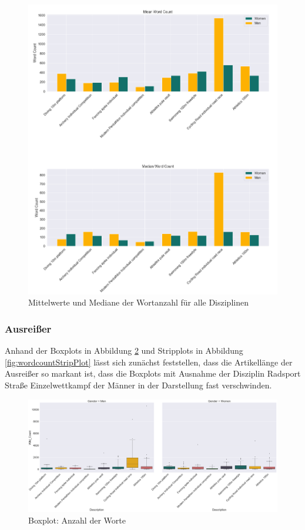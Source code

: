 \documentclass[11pt]{article}
\begin{document}
\begin{figure}
\includegraphics[width=1\textwidth]{figures/wordcount_mean_median.png}
\caption[Mittelwerte und Mediane der Wortanzahl für alle Disziplinen]{Mittelwerte und Mediane der Wortanzahl für alle Disziplinen}
\label{fig:wordcountMeanMedian}
\end{figure}

\subsubsection {Ausreißer}

Anhand der Boxplots in Abbildung \ref{fig:wordcountBoxPlot} und Stripplots in Abbildung \ref{fig:wordcountStripPlot} lässt sich zunächst feststellen, dass die Artikellänge der Ausreißer so markant ist, dass die Boxplots mit Ausnahme der Disziplin Radsport Straße Einzelwettkampf der Männer in der Darstellung fast verschwinden.

\begin{figure}
\includegraphics[width=1\textwidth]{figures/wordcount_boxplot.png}
\caption[Boxplot: Anzahl der Worte]{Boxplot: Anzahl der Worte}
\label{fig:wordcountBoxPlot}
\end{figure}
\end{document}

